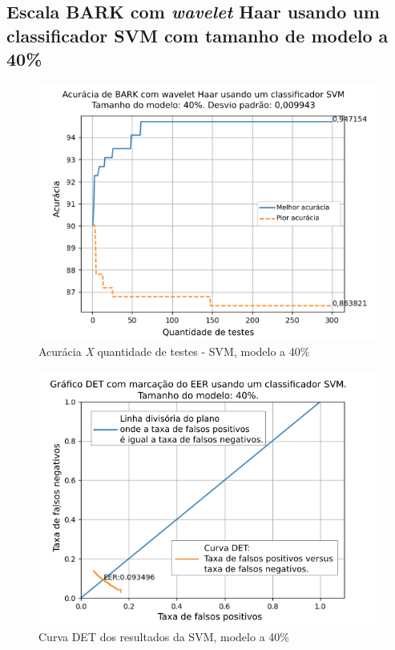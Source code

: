 \subsection{Escala BARK com \textit{wavelet} Haar usando um classificador SVM com tamanho de modelo a 40\%}


\begin{figure}[ht]
	\centering
	\includegraphics[width=.95\linewidth]{images/results/confusionMatrices/classifier_SVM_40.png}
	\caption{Acurácia \textit{X} quantidade de testes - SVM, modelo a 40\%}
	\label{fig:classifiersvm40}
\end{figure}

\begin{figure}[!h]
	\centering
	\includegraphics[width=.9\linewidth]{images/results/det/DET_SVM_40}
	\caption{Curva DET dos resultados da SVM, modelo a 40\%}
	\label{fig:detsvm40}
\end{figure}

